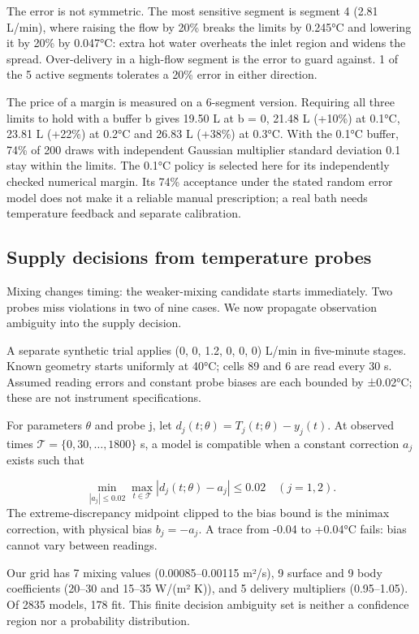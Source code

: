 \documentclass[12pt,a4paper]{article}
\begin{document}
The error is not symmetric. The most sensitive segment is segment 4 (2.81 L/min), where raising the flow by 20\% breaks the limits by 0.245°C and lowering it by 20\% by 0.047°C: extra hot water overheats the inlet region and widens the spread. Over-delivery in a high-flow segment is the error to guard against. 1 of the 5 active segments tolerates a 20\% error in either direction.

The price of a margin is measured on a 6-segment version. Requiring all three limits to hold with a buffer b gives 19.50 L at b = 0, 21.48 L (+10\%) at 0.1°C, 23.81 L (+22\%) at 0.2°C and 26.83 L (+38\%) at 0.3°C. With the 0.1°C buffer, 74\% of 200 draws with independent Gaussian multiplier standard deviation 0.1 stay within the limits. The 0.1°C policy is selected here for its independently checked numerical margin. Its 74\% acceptance under the stated random error model does not make it a reliable manual prescription; a real bath needs temperature feedback and separate calibration.

\subsection{Supply decisions from temperature probes}
Mixing changes timing: the weaker-mixing candidate starts immediately. Two probes miss violations in two of nine cases. We now propagate observation ambiguity into the supply decision.

A separate synthetic trial applies (0, 0, 1.2, 0, 0, 0) L/min in five-minute stages. Known geometry starts uniformly at 40°C; cells 89 and 6 are read every 30 s. Assumed reading errors and constant probe biases are each bounded by ±0.02°C; these are not instrument specifications.

For parameters $\theta$ and probe j, let $d_j(t;\theta)=T_j(t;\theta)-y_j(t)$. At observed times $\mathcal{T}=\{0,30,\ldots,1800\}$ s, a model is compatible when a constant correction $a_j$ exists such that

\begin{equation}\min_{|a_j|\leq0.02}\max_{t\in\mathcal{T}}|d_j(t;\theta)-a_j|\leq0.02\quad(j=1,2).\end{equation}
The extreme-discrepancy midpoint clipped to the bias bound is the minimax correction, with physical bias $b_j=-a_j$. A trace from -0.04 to +0.04°C fails: bias cannot vary between readings.

Our grid has 7 mixing values (0.00085–0.00115 m²/s), 9 surface and 9 body coefficients (20–30 and 15–35 W/(m² K)), and 5 delivery multipliers (0.95–1.05). Of 2835 models, 178 fit. This finite decision ambiguity set is neither a confidence region nor a probability distribution.
\end{document}
